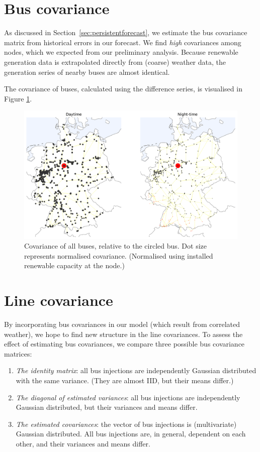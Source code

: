 \documentclass[main.tex]{subfiles}
\begin{document}
\section{Bus covariance}
As discussed in Section~\ref{sec:persistentforecast}, we estimate the bus covariance matrix from historical errors in our forecast. We find \emph{high} covariances among nodes, which we expected from our preliminary analysis. Because renewable generation data is extrapolated directly from (coarse) weather data, the generation series of nearby buses are almost identical. 

The covariance of buses, calculated using the difference series, is visualised in Figure \ref{fig:buscov}. 
\begin{figure}[ht]
    \centering
    \includegraphics[width=\textwidth]{img/bus_correlation_123_fullcov_day_and_night.pdf}
    \caption{
    \label{fig:buscov}Covariance of all buses, relative to the circled bus. Dot size represents normalised covariance. (Normalised using installed renewable capacity at the node.)}
\end{figure}

\section{Line covariance}
By incorporating bus covariances in our model (which result from correlated weather), we hope to find new structure in the line covariances. 
To assess the effect of estimating bus covariances, we compare three possible bus covariance matrices:
\begin{enumerate}
	\item \emph{The identity matrix}: all bus injections are independently Gaussian distributed with the same variance. (They are almost IID, but their means differ.)
	\item \emph{The diagonal of estimated variances}: all bus injections are independently Gaussian distributed, but their variances and means differ.
	\item \emph{The estimated covariances}: the vector of bus injections is (multivariate) Gaussian distributed. All bus injections are, in general, dependent on each other, and their variances and means differ.
\end{enumerate}
\end{document}
